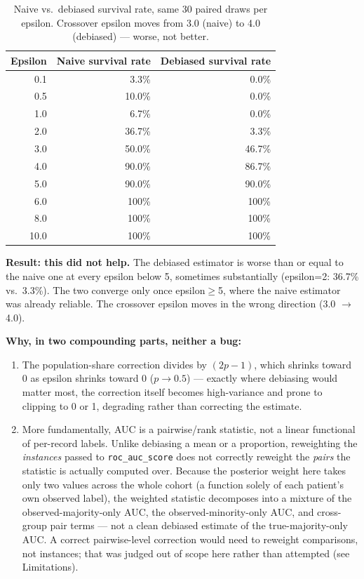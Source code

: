 \documentclass[11pt]{article}
\begin{document}
\begin{table}[H]
\centering
\begin{tabular}{rrr}
\toprule
Epsilon & Naive survival rate & Debiased survival rate \\
\midrule
0.1 & 3.3\% & 0.0\% \\
0.5 & 10.0\% & 0.0\% \\
1.0 & 6.7\% & 0.0\% \\
2.0 & 36.7\% & 3.3\% \\
3.0 & 50.0\% & 46.7\% \\
4.0 & 90.0\% & 86.7\% \\
5.0 & 90.0\% & 90.0\% \\
6.0 & 100\% & 100\% \\
8.0 & 100\% & 100\% \\
10.0 & 100\% & 100\% \\
\bottomrule
\end{tabular}
\caption{Naive vs.\ debiased survival rate, same 30 paired draws per epsilon. Crossover epsilon moves from 3.0 (naive) to 4.0 (debiased) --- worse, not better.}
\label{tab:debiased}
\end{table}

\textbf{Result: this did not help.} The debiased estimator is worse than or equal to the naive one at every epsilon below 5, sometimes substantially (epsilon=2: 36.7\% vs.\ 3.3\%). The two converge only once epsilon$\geq$5, where the naive estimator was already reliable. The crossover epsilon moves in the wrong direction (3.0 $\to$ 4.0).

\textbf{Why, in two compounding parts, neither a bug:}
\begin{enumerate}
\item The population-share correction divides by $(2p-1)$, which shrinks toward 0 as epsilon shrinks toward 0 ($p \to 0.5$) --- exactly where debiasing would matter most, the correction itself becomes high-variance and prone to clipping to 0 or 1, degrading rather than correcting the estimate.
\item More fundamentally, AUC is a pairwise/rank statistic, not a linear functional of per-record labels. Unlike debiasing a mean or a proportion, reweighting the \emph{instances} passed to \texttt{roc\_auc\_score} does not correctly reweight the \emph{pairs} the statistic is actually computed over. Because the posterior weight here takes only two values across the whole cohort (a function solely of each patient's own observed label), the weighted statistic decomposes into a mixture of the observed-majority-only AUC, the observed-minority-only AUC, and cross-group pair terms --- not a clean debiased estimate of the true-majority-only AUC. A correct pairwise-level correction would need to reweight comparisons, not instances; that was judged out of scope here rather than attempted (see Limitations).
\end{enumerate}
\end{document}
